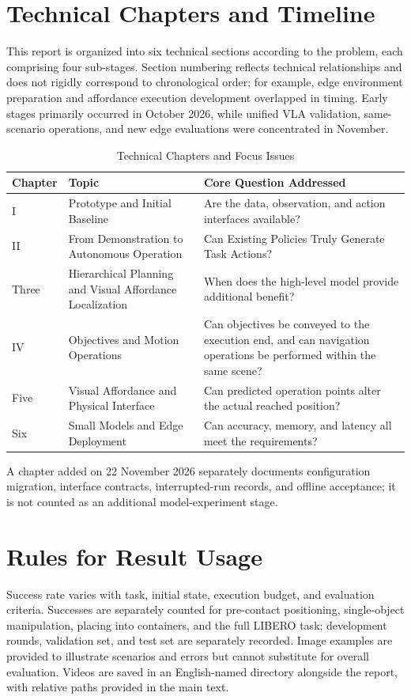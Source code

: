 \section{Technical Chapters and Timeline}
This report is organized into six technical sections according to the problem, each comprising four sub-stages. Section numbering reflects technical relationships and does not rigidly correspond to chronological order; for example, edge environment preparation and affordance execution development overlapped in timing. Early stages primarily occurred in October 2026, while unified VLA validation, same-scenario operations, and new edge evaluations were concentrated in November.
\begin{table}[htbp]\centering\begin{tabular}{p{.10\linewidth}p{.31\linewidth}p{.49\linewidth}}
\toprule Chapter & Topic & Core Question Addressed \\\midrule
I & Prototype and Initial Baseline & Are the data, observation, and action interfaces available? \\
II & From Demonstration to Autonomous Operation & Can Existing Policies Truly Generate Task Actions? \\
Three & Hierarchical Planning and Visual Affordance Localization & When does the high-level model provide additional benefit? \\
IV & Objectives and Motion Operations & Can objectives be conveyed to the execution end, and can navigation operations be performed within the same scene? \\
Five & Visual Affordance and Physical Interface & Can predicted operation points alter the actual reached position? \\
Six & Small Models and Edge Deployment & Can accuracy, memory, and latency all meet the requirements?\\\bottomrule
\end{tabular}\caption{Technical Chapters and Focus Issues}\end{table}
A chapter added on 22 November 2026 separately documents configuration migration, interface contracts, interrupted-run records, and offline acceptance; it is not counted as an additional model-experiment stage.
\section{Rules for Result Usage}
Success rate varies with task, initial state, execution budget, and evaluation criteria. Successes are separately counted for pre-contact positioning, single-object manipulation, placing into containers, and the full LIBERO task; development rounds, validation set, and test set are separately recorded. Image examples are provided to illustrate scenarios and errors but cannot substitute for overall evaluation. Videos are saved in an English-named directory alongside the report, with relative paths provided in the main text.

